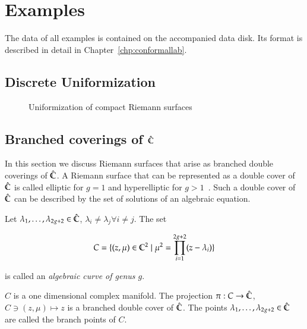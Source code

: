 \documentclass[Thesis.tex]{subfiles}
\begin{document}
\chapter{Examples}
\label{chp:conformal_examples}

The data of all examples is contained on the accompanied data disk. Its format
is described in detail in Chapter~\ref{chp:conformallab}.

\section{Discrete Uniformization}
\label{sec:example_discrete_uniformization}

\begin{figure}
\centering
{}
\caption{Uniformization of compact Riemann surfaces}
\label{fig:intro_uniformization}
\end{figure}

\section{Branched coverings of $\hat{\mathbb C}$}
\label{sec:branched_coverings}

In this section we discuss Riemann surfaces that arise as branched double
coverings of $\hat{\mathbb C}$. A Riemann surface that can be represented as a double
cover of $\hat{\mathbb C}$ is called elliptic for $g=1$ and hyperelliptic for
$g>1$~\cite[p.~235]{Jost2007}. Such a double cover of $\hat{\mathbb C}$ can be described
by the set of solutions of an algebraic equation.

\begin{definition}
Let $\lambda_1,\ldots,\lambda_{2g+2}\in \hat{\mathbb C}$, $\lambda_i\neq \lambda_j
\forall i\neq j$. The set

\begin{equation}
\label{eq:branched_cover}
C=\{(z, \mu)\in\mathbb C^2 \mid \mu^2 = \prod_{i=1}^{2g+2}(z-\lambda_i)\}
\end{equation}

is called an \emph{algebraic curve of genus $g$}.
\end{definition}

$C$ is a one dimensional complex manifold. The projection $\pi:C\to\hat{\mathbb C}$,
$C\ni(z,\mu)\mapsto z$ is a branched double cover of $\hat{\mathbb C}$. The points
$\lambda_1,\ldots,\lambda_{2g+2}\in \hat{\mathbb C}$ are called the branch points of
$C$.
\end{document}
